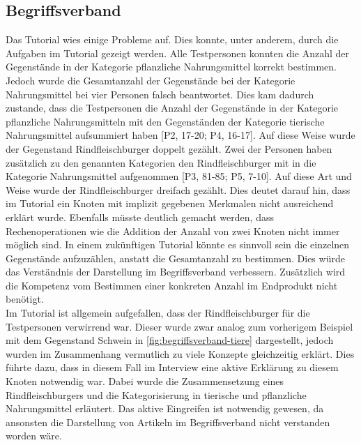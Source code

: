\subsection{Begriffsverband}
Das Tutorial wies einige Probleme auf.
Dies konnte, unter anderem, durch die Aufgaben im Tutorial gezeigt werden.
Alle Testpersonen konnten die Anzahl der Gegenstände in der Kategorie pflanzliche Nahrungsmittel korrekt bestimmen.
Jedoch wurde die Gesamtanzahl der Gegenstände bei der Kategorie Nahrungsmittel bei vier Personen falsch beantwortet.
Dies kam dadurch zustande, dass die Testpersonen die Anzahl der Gegenstände in der Kategorie pflanzliche Nahrungsmitteln mit den Gegenständen der Kategorie tierische Nahrungsmittel aufsummiert haben [P2, 17-20; P4, 16-17].
Auf diese Weise wurde der Gegenstand Rindfleischburger doppelt gezählt.
Zwei der Personen haben zusätzlich zu den genannten Kategorien den Rindfleischburger mit in die Kategorie Nahrungsmittel aufgenommen [P3, 81-85; P5, 7-10].
Auf diese Art und Weise wurde der Rindfleischburger dreifach gezählt.
Dies deutet darauf hin, dass im Tutorial ein Knoten mit implizit gegebenen Merkmalen nicht ausreichend erklärt wurde.
Ebenfalls müsste deutlich gemacht werden, dass Rechenoperationen wie die Addition der Anzahl von zwei Knoten nicht immer möglich sind.
In einem zukünftigen Tutorial könnte es sinnvoll sein die einzelnen Gegenstände aufzuzählen, anstatt die Gesamtanzahl zu bestimmen.
Dies würde das Verständnis der Darstellung im Begriffsverband verbessern.
Zusätzlich wird die Kompetenz vom Bestimmen einer konkreten Anzahl im Endprodukt nicht benötigt.\\

Im Tutorial ist allgemein aufgefallen, dass der Rindfleischburger für die Testpersonen verwirrend war.
Dieser wurde zwar analog zum vorherigem Beispiel mit dem Gegenstand Schwein in \autoref{fig:begriffsverband-tiere} dargestellt, jedoch wurden im Zusammenhang vermutlich zu viele Konzepte gleichzeitig erklärt.
Dies führte dazu, dass in diesem Fall im Interview eine aktive Erklärung zu diesem Knoten notwendig war.
Dabei wurde die Zusammensetzung eines Rindfleischburgers und die Kategorisierung in tierische und pflanzliche Nahrungsmittel erläutert.
Das aktive Eingreifen ist notwendig gewesen, da ansonsten die Darstellung von Artikeln im Begriffsverband nicht verstanden worden wäre.\\


